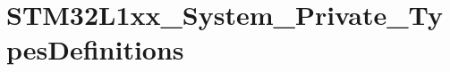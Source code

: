 \hypertarget{group___s_t_m32_l1xx___system___private___types_definitions}{\section{S\-T\-M32\-L1xx\-\_\-\-System\-\_\-\-Private\-\_\-\-Types\-Definitions}
\label{group___s_t_m32_l1xx___system___private___types_definitions}
}
